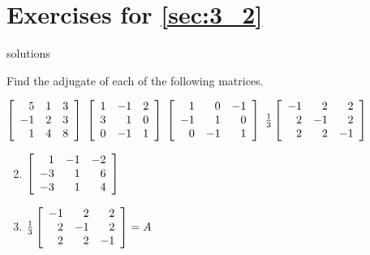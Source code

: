 \section*{Exercises for \ref{sec:3_2}}

\begin{Filesave}{solutions}
\end{Filesave}

\begin{multicols}{2}
\begin{ex}
Find the adjugate of each of the following matrices.

\begin{exenumerate}
\exitem $\left[ \begin{array}{rrr}
5 & 1 & 3 \\
-1 & 2 & 3 \\
1 & 4 & 8
\end{array}\right]$
\exitem  $\left[ \begin{array}{rrr}
1 & -1 & 2 \\
3 & 1 & 0 \\
0 & -1 & 1
\end{array}\right]$
\exitem $\left[ \begin{array}{rrr}
1 & 0 & -1 \\
-1 & 1 & 0 \\
0 & -1 & 1
\end{array}\right]$
\exitem  $\tfrac{1}{3}\left[ \begin{array}{rrr}
-1 & 2 & 2 \\
2 & -1 & 2 \\
2 & 2 & -1
\end{array}\right]$
\end{exenumerate}
\begin{sol}
\begin{enumerate}[label={\alph*.}]
\setcounter{enumi}{1}
\item   $\left[ \begin{array}{rrr}
1 & -1 & -2 \\
-3 & 1 & 6 \\
-3 & 1 & 4
\end{array}\right]$

\setcounter{enumi}{3}
\item   $\tfrac{1}{3}\left[ \begin{array}{rrr}
-1 & 2 & 2 \\
2 & -1 & 2 \\
2 & 2 & -1
\end{array}\right] = A$
\end{enumerate}
\end{sol}
\end{ex}


\end{multicols}
